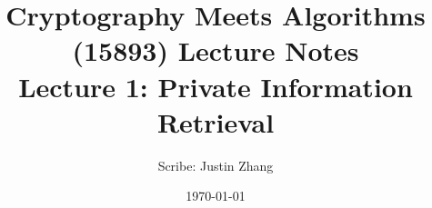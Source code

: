 \documentclass[11pt]{article}
\title{{\Large Cryptography Meets Algorithms (15893) Lecture Notes}\\[5pt]
{\bf Lecture 1: Private Information Retrieval}}
\author{Scribe: Justin Zhang}
\date{\today}
\begin{document}
\maketitle


{

}
%



\end{document}

